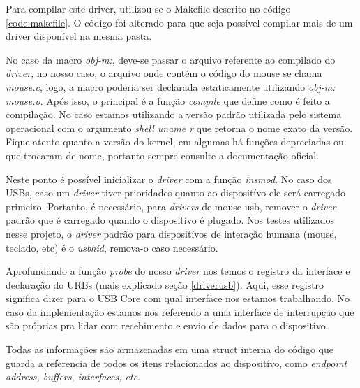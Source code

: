 Para compilar este driver, utilizou-se o Makefile descrito no código \ref{code:makefile}. O
código foi alterado para que seja possível compilar mais de um driver disponível na mesma pasta.

\lstset{style=shell}


No caso da macro \textit{obj-m:}, deve-se passar o arquivo referente ao compilado do \textit{driver}, no nosso
caso, o arquivo onde contém o código do mouse se chama \textit{mouse.c}, logo, a macro poderia ser
declarada estaticamente utilizando \textit{obj-m: mouse.o}. Após isso, o principal é a função \textit{compile}
que define como é feito a compilação. No caso estamos utilizando a versão padrão utilizada
pelo sistema operacional com o argumento \textit{shell uname \-r} que retorna o nome exato da versão.
Fique atento quanto a versão do kernel, em algumas há funções depreciadas ou que trocaram
de nome, portanto sempre consulte a documentação oficial.

Neste ponto é possível inicializar o \textit{driver} com a função \textit{insmod}. No caso dos USBs, caso um
\textit{driver} tiver prioridades quanto ao dispositívo ele será carregado primeiro. Portanto, é
necessário, para \textit{drivers} de mouse usb, remover o \textit{driver} padrão que é carregado quando
o dispositívo é plugado. Nos testes utilizados nesse projeto, o \textit{driver} padrão para
dispositívos de interação humana (mouse, teclado, etc) é o \textit{usbhid}, remova-o caso
necessário.


Aprofundando a função \textit{probe} do nosso \textit{driver} nos temos o registro da interface e declaração do URBs
(mais explicado seção \ref{driverusb}). Aqui, esse registro significa dizer para o USB Core com qual
interface nos estamos trabalhando. No caso da implementação estamos nos referendo a uma interface
de interrupção que são próprias pra lidar com recebimento e envio de dados para o dispositivo.
\lstset{style=shell}


\lstset{style=shell}


Todas as informações são armazenadas em uma struct interna do código que guarda a referencia
de todos os itens relacionados ao dispositívo, como \textit{endpoint address, buffers, interfaces, etc}.

